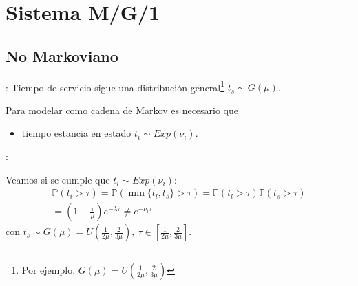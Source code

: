 \documentclass[xcolor={x11names}]{beamer}
\begin{document}
\section{Sistema M/G/1}
\subsection{No Markoviano}
\begin{frame}{\secname: \subsecname}
    Tiempo de servicio sigue una distribución
    general\footnote{Por ejemplo,
    $G(\mu)=U(\tfrac{1}{2\mu}, \tfrac{2}{3\mu})$}
    $t_s\sim G(\mu)$.

    \begin{figure}
        
    \end{figure}

    \vfill
    Para modelar como cadena de Markov
    es necesario que
    \begin{itemize}
        \item tiempo estancia en estado
            $t_i\sim Exp(\nu_i)$.
    \end{itemize}
\end{frame}



\begin{frame}{\secname: \subsecname}
    \begin{figure}
        
    \end{figure}

    \vfill
    Veamos si se cumple que $t_i\sim Exp(\nu_i)$:
    \begin{multline}
        \mathbb{P}(t_i>\tau) =
        \mathbb{P}(\min\{t_l,t_s\}>\tau)=
        \mathbb{P}(t_l>\tau)
        \mathbb{P}(t_s>\tau)\\
        =
        \left(1 - \frac{\tau}{\mu} \right)
        e^{-\lambda\tau} \neq e^{-\nu_i \tau}
    \end{multline}
    con $t_s\sim G(\mu)=U\left(\tfrac{1}{2\mu},
    \tfrac{2}{3\mu}\right),\
    \tau\in\left[\tfrac{1}{2\mu},
    \tfrac{2}{3\mu}\right]$.
\end{frame}
\end{document}
